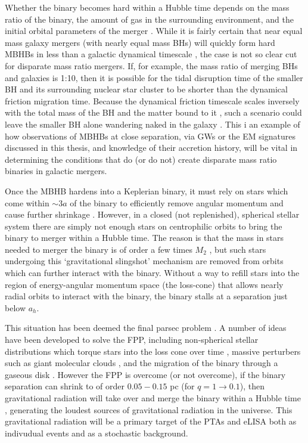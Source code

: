 Whether the binary becomes hard within a Hubble time depends on the mass ratio
of the binary, the amount of gas in the surrounding environment, and the
initial orbital parameters of the merger \citep{Mayer:2013:MBHBGasRev}. While
it is fairly certain that near equal mass galaxy mergers (with nearly equal
mass BHs) will quickly form hard MBHBs in less than a galactic dynamical
timescale \citep{Mayer+2007, Chapon+2013}, the case is not so clear cut for
disparate mass ratio mergers. If, for example, the mass ratio of merging BHs
and galaxies is 1:10, then it is possible for the tidal disruption time of the
smaller BH and its surrounding nuclear star cluster to be shorter than the
dynamical friction migration time. Because the dynamical friction timescale
scales inversely with the total mass of the BH and the matter bound to it
\citep{Chandrasekhar:1943, ColpiDotti:2011:rev}, such a scenario could leave
the smaller BH alone wandering naked in the galaxy \citep{Callegari:2011,
Mayer:2013:MBHBGasRev}. This i an example of how observations of MBHBs at
close separation, via GWs or the EM signatures discussed in this thesis, and
knowledge of their accretion history, will be vital in determining the
conditions that do (or do not) create disparate mass ratio binaries in
galactic mergers.

Once the MBHB hardens into a Keplerian binary, it must rely on stars which
come within $\sim3a$ of the binary to efficiently remove angular momentum and
cause further shrinkage \citep{Saslaw:1974}. However, in a closed (not
replenished),  spherical stellar system there are simply not enough stars on
centrophilic orbits to bring the binary to merger within a Hubble time. The
reason is that the mass in stars needed to merger the binary is of order a few
times $M_2$ \citep{MerrittMilos:2005:LRR}, but such stars undergoing this
`gravitational slingshot' mechanism are removed from orbits which can further
interact with the binary. Without a way to refill stars into the region of
energy-angular momentum space (the loss-cone) that allows nearly radial orbits
to interact with the binary, the binary stalls at a separation just below
$a_h$.

This situation has been deemed the final parsec problem
\citep[FPP][]{Milosavljevic:2003:FPcP}. A number of ideas have been developed to
solve the FPP, including non-spherical stellar distributions which torque
stars into the loss cone over time \citep{triaxialFPPsolns}, massive
perturbers such as giant molecular clouds \citep{massivpertFPPsolns}, and the
migration of the binary through a gaseous disk \citep{GouldRix:2000,
ArmNat:2002:ApJL}. %
However the FPP is overcome (or not overcome), if the binary separation can shrink to of order $0.05-0.15$ pc (for $q=1 \rightarrow 0.1$), then gravitational radiation
will take over and merge the binary within a Hubble time \citep{Peters64},
generating the loudest sources of gravitational radiation in the universe.
This gravitational radiation will be a primary target of the PTAs and eLISA
both as indivudual events and as a stochastic background.

